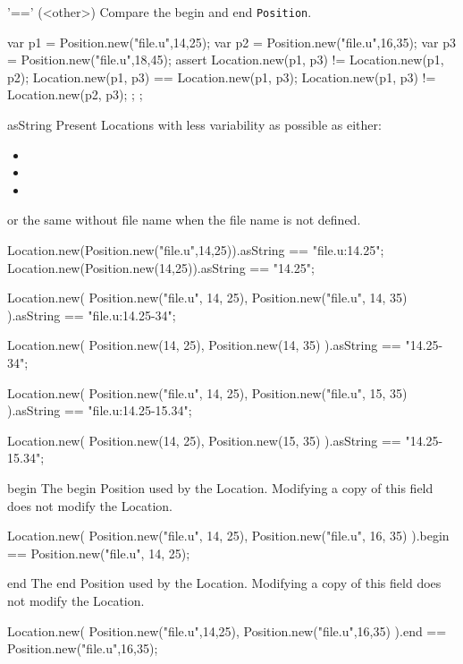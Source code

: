 \begin{urbiscriptapi}
\item['=='](<other>)%
  Compare the begin and end \lstinline|Position|.
\begin{urbiscript}
{
  var p1 = Position.new("file.u",14,25);
  var p2 = Position.new("file.u",16,35);
  var p3 = Position.new("file.u",18,45);
  assert
  {
    Location.new(p1, p3) != Location.new(p1, p2);
    Location.new(p1, p3) == Location.new(p1, p3);
    Location.new(p1, p3) != Location.new(p2, p3);
  };
};
\end{urbiscript}


\item[asString]%
  Present Locations with less variability as possible as either:
  \begin{itemize}
  \item {}
  \item {}
  \item {}
  \end{itemize}
  or the same without file name when the file name is not defined.
\begin{urbiassert}
Location.new(Position.new("file.u",14,25)).asString == "file.u:14.25";
Location.new(Position.new(14,25)).asString == "14.25";

Location.new(
  Position.new("file.u", 14, 25),
  Position.new("file.u", 14, 35)
).asString == "file.u:14.25-34";

Location.new(
  Position.new(14, 25),
  Position.new(14, 35)
).asString == "14.25-34";

Location.new(
  Position.new("file.u", 14, 25),
  Position.new("file.u", 15, 35)
).asString == "file.u:14.25-15.34";

Location.new(
  Position.new(14, 25),
  Position.new(15, 35)
).asString == "14.25-15.34";
\end{urbiassert}


\item[begin]%
  The begin Position used by the Location.  Modifying a copy of this field
  does not modify the Location.
\begin{urbiassert}
Location.new(
  Position.new("file.u", 14, 25),
  Position.new("file.u", 16, 35)
).begin == Position.new("file.u", 14, 25);
\end{urbiassert}


\item[end]%
  The end Position used by the Location.  Modifying a copy of this field
  does not modify the Location.
\begin{urbiassert}
Location.new(
  Position.new("file.u",14,25),
  Position.new("file.u",16,35)
).end == Position.new("file.u",16,35);
\end{urbiassert}
\end{urbiscriptapi}

